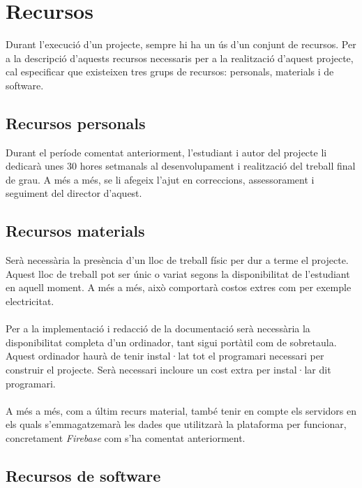\section{Recursos}

Durant l'execució d'un projecte, sempre hi ha un ús d'un conjunt de recursos. Per a la descripció d'aquests recursos necessaris per a la realització d'aquest projecte, cal especificar que existeixen tres grups de recursos: personals, materials i de software.

\subsection{Recursos personals}

Durant el període comentat anteriorment, l'estudiant i autor del projecte li dedicarà unes 30 hores setmanals al desenvolupament i realització del treball final de grau. A més a més, se li afegeix l'ajut en correccions, assessorament i seguiment del director d'aquest.

\subsection{Recursos materials}

Serà necessària la presència d'un lloc de treball físic per dur a terme el projecte. Aquest lloc de treball pot ser únic o variat segons la disponibilitat de l'estudiant en aquell moment. A més a més, això comportarà costos extres com per exemple electricitat.
\\\\
Per a la implementació i redacció de la documentació serà necessària la disponibilitat completa d'un ordinador, tant sigui portàtil com de sobretaula. Aquest ordinador haurà de tenir instal·lat tot el programari necessari per construir el projecte. Serà necessari incloure un cost extra per instal·lar dit programari.
\\\\
A més a més, com a últim recurs material, també tenir en compte els servidors en els quals s'emmagatzemarà les dades que utilitzarà la plataforma per funcionar, concretament \textit{Firebase} com s'ha comentat anteriorment.

\subsection{Recursos de software}

